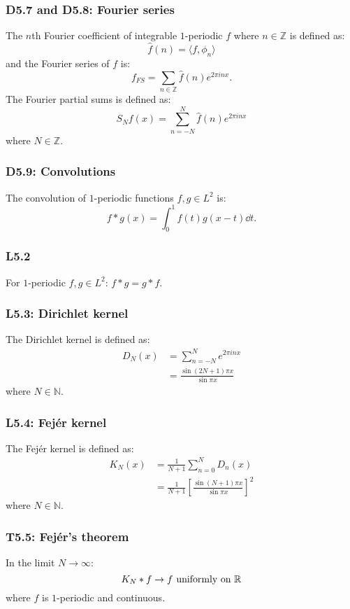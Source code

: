 \documentclass{article}
\begin{document}
\begin{multicols*}{3}
\subsubsection*{D5.7 and D5.8: Fourier series}
The $n$th Fourier coefficient of integrable $1$-periodic $f$
where $n\in\mathbb{Z}$ is defined as:
$$\widehat{f}(n)=\langle f,\phi_n\rangle$$
and the Fourier series of $f$ is:
$$f_{FS}=\sum_{n\in\mathbb{Z}}\widehat{f}(n)
e^{2\pi inx}.$$
The Fourier partial sums is defined as:
$$S_N f(x)=\sum_{n=-N}^{N}
\widehat{f}(n)e^{2\pi inx}$$
where $N\in\mathbb{Z}$.

\subsubsection*{D5.9: Convolutions}
The convolution of $1$-periodic
functions $f,g\in L^2$ is:
$$f*g(x)=\int_{0}^{1}f(t)g(x-t)\dd t.$$

\subsubsection*{L5.2}
For $1$-periodic $f,g\in L^2$:
$f*g=g*f$.

\subsubsection*{L5.3: Dirichlet kernel}
The Dirichlet kernel is defined as:
\begin{align*}
    D_N(x)
    &=\sum_{n=-N}^{N}e^{2\pi inx} \\
    &=\frac{\sin(2N+1)\pi x}{\sin\pi x}
\end{align*}
where $N\in\mathbb{N}$.

\subsubsection*{L5.4: Fej\'er kernel}
The Fej\'er kernel is defined as:
\begin{align*}
    K_N(x)
    &=\frac{1}{N+1}
    \sum_{n=0}^{N}D_n(x) \\
    &=\frac{1}{N+1}
    \left[\frac{\sin(N+1)\pi x}
    {\sin\pi x}\right]^2
\end{align*}
where $N\in\mathbb{N}$.

\subsubsection*{T5.5: Fej\'er's theorem}
In the limit $N\rightarrow\infty$:
$$K_N*f\rightarrow f\hspace{0.05in}
\text{uniformly on $\mathbb{R}$}$$
where $f$ is $1$-periodic and continuous.


\end{multicols*}
\end{document}

